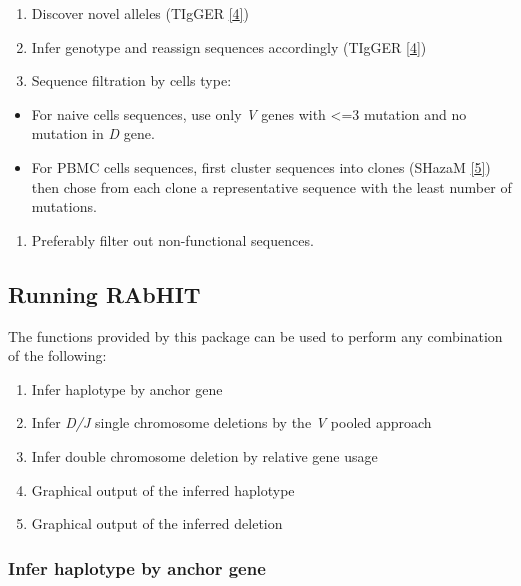 \documentclass[11pt,]{article}
\providecommand{\tightlist}{%
  \setlength{\itemsep}{0pt}\setlength{\parskip}{0pt}}
\begin{document}
\begin{enumerate}
\def\labelenumi{\arabic{enumi}.}
\tightlist
\item
  Discover novel alleles (TIgGER
  \href{https://shazam.readthedocs.io/en/version-0.1.10/}{{[}4{]}})
\item
  Infer genotype and reassign sequences accordingly (TIgGER
  \href{https://tigger.readthedocs.io/en/0.3.1/}{{[}4{]}})
\item
  Sequence filtration by cells type:
\end{enumerate}

\begin{itemize}
\tightlist
\item
  For naive cells sequences, use only \emph{V} genes with \textless{}=3
  mutation and no mutation in \emph{D} gene.
\item
  For PBMC cells sequences, first cluster sequences into clones (SHazaM
  \href{https://shazam.readthedocs.io/en/version-0.1.10/}{{[}5{]}}) then
  chose from each clone a representative sequence with the least number
  of mutations.
\end{itemize}

\begin{enumerate}
\def\labelenumi{\arabic{enumi}.}
\setcounter{enumi}{3}
\tightlist
\item
  Preferably filter out non-functional sequences.
\end{enumerate}

\subsection{Running RAbHIT}\label{running-rabhit}

The functions provided by this package can be used to perform any
combination of the following:

\begin{enumerate}
\def\labelenumi{\arabic{enumi}.}
\tightlist
\item
  Infer haplotype by anchor gene
\item
  Infer \emph{D/J} single chromosome deletions by the \emph{V} pooled
  approach
\item
  Infer double chromosome deletion by relative gene usage
\item
  Graphical output of the inferred haplotype
\item
  Graphical output of the inferred deletion
\end{enumerate}

\subsubsection{Infer haplotype by anchor
gene}\label{infer-haplotype-by-anchor-gene}
\end{document}
